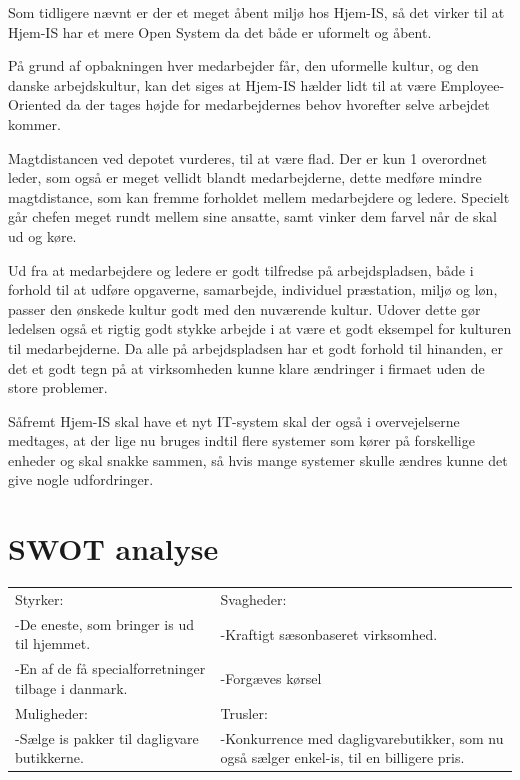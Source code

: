 Som tidligere nævnt er der et meget åbent miljø hos Hjem-IS, så det virker til at Hjem-IS har et mere Open System da det både er uformelt og åbent.

På grund af opbakningen hver medarbejder får, den uformelle kultur, og den danske arbejdskultur, kan det siges at Hjem-IS hælder lidt til at være Employee-Oriented da der tages højde for medarbejdernes behov hvorefter selve arbejdet kommer. 

Magtdistancen ved depotet vurderes, til at være flad. Der er kun 1 overordnet leder, som også er meget vellidt blandt medarbejderne, dette medføre mindre magtdistance, som kan fremme forholdet mellem medarbejdere og ledere. Specielt går chefen meget rundt mellem sine ansatte, samt vinker dem farvel når de skal ud og køre. 

Ud fra at medarbejdere og ledere er godt tilfredse på arbejdspladsen, både i forhold til at udføre opgaverne, samarbejde, individuel præstation, miljø og løn, passer den ønskede kultur godt med den nuværende kultur. Udover dette gør ledelsen også et rigtig godt stykke arbejde i at være et godt eksempel for kulturen til medarbejderne. Da alle på arbejdspladsen har et godt forhold til hinanden, er det et godt tegn på at virksomheden kunne klare ændringer i firmaet uden de store problemer. 

Såfremt Hjem-IS skal have et nyt IT-system skal der også i overvejelserne medtages, at der lige nu bruges indtil flere systemer som kører på forskellige enheder og skal snakke sammen, så hvis mange systemer skulle ændres kunne det give nogle udfordringer.
\section{SWOT analyse}
\begin{center}
\begin{tabular}{ |p{200pt}|p{200pt}| }
    \hline
    Styrker: & Svagheder: \\
    -De eneste, som bringer is ud til hjemmet. & -Kraftigt sæsonbaseret virksomhed. \\
    -En af de få specialforretninger tilbage i danmark. & -Forgæves kørsel \\
    \hline
    Muligheder: & Trusler: \\
    -Sælge is pakker til dagligvare butikkerne. & -Konkurrence med dagligvarebutikker, som nu også sælger enkel-is, til en billigere pris. \\
    \hline
\end{tabular}
\end{center}

